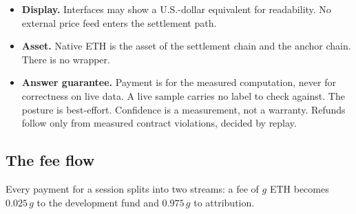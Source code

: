 \documentclass[11pt]{article}
\begin{document}
\begin{itemize}
          per-epoch query budget, capped at the axis's registered reference
          demand per epoch. Exhaustion refuses further queries, never
          silently. The budget is enforced \emph{locally} at the gateway
          the payer connects to; it is not a ledger object and no per-payer
          consumption rate is ever published. The only publishable view is
          the per-axis aggregate for the epoch, used over cap, with no
          payer dimension. The visible shape of an extraction campaign
          is that an axis's aggregate rises, never that a particular payer
          spends more.
    \item \textbf{Display.} Interfaces may show a U.S.-dollar
          equivalent for readability. No external price feed enters the
          settlement path.
    \item \textbf{Asset.} Native ETH is the asset of the settlement
          chain and the anchor chain. There is no wrapper.
    \item \textbf{Answer guarantee.} Payment is for the measured
          computation, never for correctness on live data. A live sample
          carries no label to check against. The posture is best-effort.
          Confidence is a measurement, not a warranty. Refunds follow only
          from measured contract violations, decided by replay.
\end{itemize}

\subsection{The fee flow}\label{sec:fees}

Every payment for a session splits into two streams: a fee of
$g$ ETH becomes $0.025\,g$ to the development fund and
$0.975\,g$ to attribution.
\end{document}

